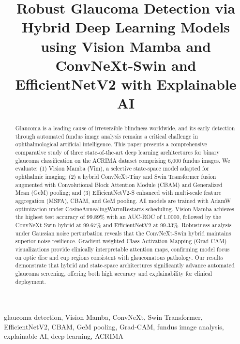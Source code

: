 \documentclass[conference]{IEEEtran}
\begin{document}
\title{Robust Glaucoma Detection via Hybrid Deep Learning Models using Vision Mamba and ConvNeXt-Swin and EfficientNetV2 with Explainable AI}


\maketitle

\begin{abstract}
Glaucoma is a leading cause of irreversible blindness worldwide, 
and its early detection through automated fundus image analysis 
remains a critical challenge in ophthalmological artificial 
intelligence. This paper presents a comprehensive comparative 
study of three state-of-the-art deep learning architectures for 
binary glaucoma classification on the ACRIMA dataset comprising 
6,000 fundus images. We evaluate: (1) Vision Mamba (Vim), a 
selective state-space model adapted for ophthalmic imaging; 
(2) a hybrid ConvNeXt-Tiny and Swin Transformer fusion augmented 
with Convolutional Block Attention Module (CBAM) and Generalized 
Mean (GeM) pooling; and (3) EfficientNetV2-S enhanced with 
multi-scale feature aggregation (MSFA), CBAM, and GeM pooling. 
All models are trained with AdamW optimization under 
CosineAnnealingWarmRestarts scheduling. Vision Mamba achieves 
the highest test accuracy of 99.89\% with an AUC-ROC of 1.0000, 
followed by the ConvNeXt-Swin hybrid at 99.67\% and 
EfficientNetV2 at 99.33\%. Robustness analysis under 
Gaussian noise perturbation reveals that the ConvNeXt-Swin 
hybrid maintains superior noise resilience. Gradient-weighted 
Class Activation Mapping (Grad-CAM) visualizations provide 
clinically interpretable attention maps, confirming model focus 
on optic disc and cup regions consistent with glaucomatous 
pathology. Our results demonstrate that hybrid and 
state-space architectures significantly advance automated 
glaucoma screening, offering both high accuracy and 
explainability for clinical deployment.
\end{abstract}

\begin{IEEEkeywords}
glaucoma detection, Vision Mamba, ConvNeXt, Swin Transformer, 
EfficientNetV2, CBAM, GeM pooling, Grad-CAM, fundus image 
analysis, explainable AI, deep learning, ACRIMA
\end{IEEEkeywords}


\end{document}
